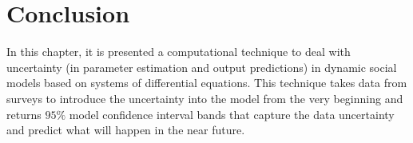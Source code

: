 %
%

\section{Conclusion}\label{3.5}
In this chapter, it is presented a computational technique to deal with uncertainty (in parameter estimation and output predictions) in dynamic social models based on systems of differential equations. This technique takes data from surveys to introduce the uncertainty into the model from the very beginning and returns $95\%$ model confidence interval bands that capture the data uncertainty and predict what will happen in the near future. 
  

